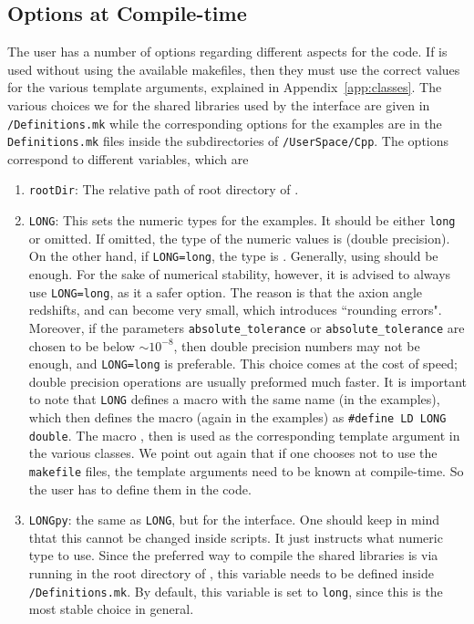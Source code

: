\documentclass[11pt,a4paper]{article}
\begin{document}
\subsection{Options at Compile-time}\label{sec:options}
%
The user has a number of options regarding different aspects for the code. If \mimes is used without using the available makefiles, then they must use the correct values for the various template arguments, explained in Appendix~\ref{app:classes}.  The various choices we for the shared libraries used by the \PY interface are given in {\tt \mimes/Definitions.mk} while the corresponding options for the \CPP examples are in the {\tt Definitions.mk} files inside the subdirectories of {\tt \mimes/UserSpace/Cpp}. The options correspond to different variables, which are
%
\begin{enumerate}
	\item {\tt rootDir}: The relative path of root directory of \mimes.  
	\item {\tt LONG}: This sets the numeric types for the \CPP examples. It should be either {\tt long} or omitted. If omitted, the type of the numeric values is  (double precision). On the other hand, if {\tt LONG=long},  the type is  . Generally, using  should be enough. For the sake of numerical stability, however, it is advised to always use {\tt LONG=long}, as it a safer option. The reason is that the axion angle redshifts, and can become very small, which introduces ``rounding errors". Moreover, if the parameters {\tt absolute\_tolerance} or {\tt absolute\_tolerance} are chosen to be below $\sim 10^{-8}$, then double precision numbers may not be enough, and {\tt LONG=long} is preferable.  This choice comes at the cost of speed; double precision operations are usually preformed much faster. It is important to note that {\tt LONG} defines a macro with the same name (in the \CPP examples), which then defines the macro (again in the \CPP examples) as {\tt \#define LD LONG double}. The macro , then is used as the corresponding template argument in the various classes. We point out again that if one chooses not to use the {\tt makefile} files, the template arguments need to be known at compile-time. So the user has to define them in the code. 
	\item {\tt LONGpy}: the same as {\tt LONG}, but for the \PY interface. One should keep in mind thtat this cannot be changed inside \PY scripts. It just instructs  what numeric type to use. Since the preferred way to compile the shared libraries is via running  in the root directory of \mimes, this variable needs to be defined inside  {\tt \mimes/Definitions.mk}. By default, this variable is set to {\tt long}, since this is the most stable choice in general.  

\end{enumerate}
\end{document}
